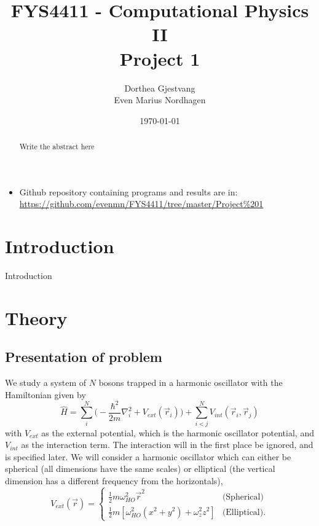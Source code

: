 \documentclass[norsk,a4paper,12pt]{article}
\title{FYS4411 - Computational Physics II\\\vspace{2mm} \Large{Project 1}}
\author{\large Dorthea Gjestvang\\ Even Marius Nordhagen}
\date\today
\begin{document}
\maketitle
\begin{abstract}
Write the abstract here
\par 

\end{abstract}


\begin{itemize}
\item Github repository containing programs and results are in: \url{https://github.com/evenmn/FYS4411/tree/master/Project%201}
\end{itemize}


\section{Introduction}
Introduction

\section{Theory}

\subsection{Presentation of problem}

We study a system of $N$ bosons trapped in a harmonic oscillator with the Hamiltonian given by 
\begin{equation}
\hat{H}=\sum_i^N\bigg(-\frac{\hbar^2}{2m}\nabla_i^2+V_{ext}(\vec{r}_i)\bigg)+\sum_{i<j}^NV_{int}(\vec{r}_i,\vec{r}_j)
\label{eq:Hamilton}
\end{equation}
with $V_{ext}$ as the external potential, which is the harmonic oscillator potential,
and $V_{int}$ as the interaction term. The interaction will in the first place be ignored, and is specified later. We will consider a harmonic oscillator which can either be spherical (all dimensions have the same scales) or elliptical (the vertical dimension has a different frequency from the horizontals),
\begin{equation}
\label{eq:V_ext}
V_{ext}(\vec{r})=
\begin{cases} 
   \frac{1}{2}m\omega_{HO}^2\vec{r}^2 & \text{(Spherical)} \\
   \frac{1}{2}m[\omega_{HO}^2(x^2 + y^2) + \omega_z^2z^2] & \text{(Elliptical)}.
\end{cases}
\end{equation}
\end{document}
